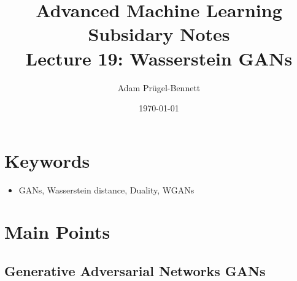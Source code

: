 \documentclass[11pt]{article}
\author{Adam Prügel-Bennett}
\date{\today}
\title{Advanced Machine Learning Subsidary Notes\\\medskip
\large Lecture 19: Wasserstein GANs}
\begin{document}
\maketitle

\section{Keywords}
\label{sec:org55ac366}
\begin{itemize}
\item GANs, Wasserstein distance, Duality, WGANs
\end{itemize}

\section{Main Points}
\label{sec:org5c06fe6}
\subsection{Generative Adversarial Networks GANs}
\label{sec:orgf589a09}
\end{document}

